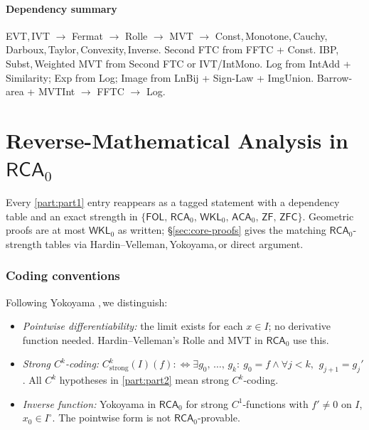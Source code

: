 \documentclass[11pt,reqno]{amsart}
\newcommand{\comma}{,\,\allowbreak}
\theoremstyle{redplain}
\begin{document}
\subsection*{Dependency summary}

EVT\comma IVT $\to$ Fermat $\to$ Rolle $\to$ MVT $\to$ Const\comma Monotone\comma Cauchy\comma Darboux\comma Taylor\comma Convexity\comma Inverse. Second FTC from FFTC + Const. IBP\comma Subst\comma Weighted MVT from Second FTC or IVT/IntMono. Log from IntAdd + Similarity; Exp from Log; Image from LnBij + Sign-Law + ImgUnion. Barrow-area + MVTInt $\to$ FFTC $\to$ Log.

\part{\texorpdfstring{Reverse-Mathematical Analysis in $\mathsf{RCA}_0$}{Reverse-Mathematical Analysis in RCA0}}
\label{part:part2}
\noindent Every \autoref{part:part1} entry reappears as a tagged statement with a dependency table and an exact strength in $\{\textsf{FOL}\comma\textsf{RCA}_0\comma\textsf{WKL}_0\comma\textsf{ACA}_0\comma\textsf{ZF}\comma\textsf{ZFC}\}$. Geometric proofs are at most $\textsf{WKL}_0$ as written; \S\ref{sec:core-proofs} gives the matching $\textsf{RCA}_0$-strength tables via Hardin--Velleman\comma Yokoyama\comma or direct argument.

\section{Coding conventions}
\label{sec:coding}

\noindent Following Yokoyama \cite{Yokoyama2010}\comma we distinguish:
\begin{itemize}
	\item \emph{Pointwise differentiability:} the limit exists for each $x\in I$; no derivative function needed. Hardin--Velleman's Rolle and MVT in $\textsf{RCA}_0$ use this.
	\item \emph{Strong $C^k$-coding:} $C^k_{\mathrm{strong}}(I)(f):\iff\exists g_0\comma\dots\comma g_k:\ g_0=f\wedge\forall j<k\comma\ g_{j+1}=g_j'$. All $C^k$ hypotheses in \autoref{part:part2} mean strong $C^k$-coding.
	\item \emph{Inverse function:} Yokoyama \cite[Thm.~3.22]{Yokoyama2010} in $\textsf{RCA}_0$ for strong $C^1$-functions with $f'\ne0$ on $I$\comma $x_0\in I^\circ$. The pointwise form is not $\textsf{RCA}_0$-provable.
\end{itemize}
\end{document}
